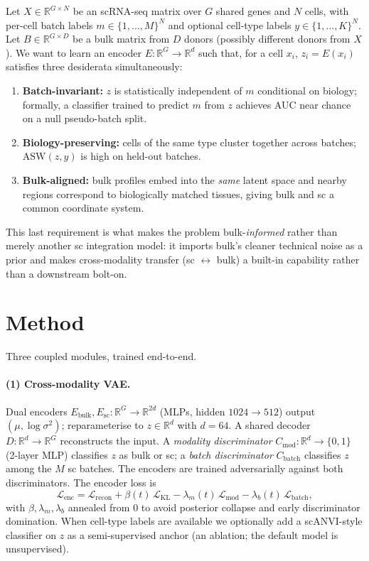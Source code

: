 \documentclass[11pt]{article}
\begin{document}
Let $X \in \mathbb{R}^{G \times N}$ be an scRNA-seq matrix over $G$ shared
genes and $N$ cells, with per-cell batch labels $m \in \{1,\dots,M\}^{N}$ and
optional cell-type labels $y \in \{1,\dots,K\}^{N}$. Let
$B \in \mathbb{R}^{G \times D}$ be a bulk matrix from $D$ donors (possibly
different donors from $X$). We want to learn an encoder
$E: \mathbb{R}^{G} \to \mathbb{R}^{d}$ such that, for a cell $x_i$,
$z_i = E(x_i)$ satisfies three desiderata simultaneously:
\begin{enumerate}
\itemsep=0pt
\item \textbf{Batch-invariant:} $z$ is statistically independent of $m$
  conditional on biology; formally, a classifier trained to predict $m$ from
  $z$ achieves AUC near chance on a null pseudo-batch split.
\item \textbf{Biology-preserving:} cells of the same type cluster together
  across batches; $\mathrm{ASW}(z, y)$ is high on held-out batches.
\item \textbf{Bulk-aligned:} bulk profiles embed into the \emph{same} latent
  space and nearby regions correspond to biologically matched tissues, giving
  bulk and sc a common coordinate system.
\end{enumerate}
This last requirement is what makes the problem bulk-\emph{informed} rather
than merely another sc integration model: it imports bulk's cleaner technical
noise as a prior and makes cross-modality transfer (sc $\leftrightarrow$ bulk)
a built-in capability rather than a downstream bolt-on.

\section{Method}

Three coupled modules, trained end-to-end.

\paragraph{(1) Cross-modality VAE.}
Dual encoders $E_{\mathrm{bulk}}, E_{\mathrm{sc}}: \mathbb{R}^{G} \to
\mathbb{R}^{2d}$ (MLPs, hidden $1024 \to 512$) output
$(\mu, \log\sigma^{2})$; reparameterise to $z \in \mathbb{R}^{d}$ with
$d{=}64$. A shared decoder $D: \mathbb{R}^{d} \to \mathbb{R}^{G}$
reconstructs the input. A \emph{modality discriminator}
$C_{\mathrm{mod}}: \mathbb{R}^{d} \to \{0,1\}$ (2-layer MLP) classifies $z$ as
bulk or sc; a \emph{batch discriminator} $C_{\mathrm{batch}}$ classifies $z$
among the $M$ sc batches. The encoders are trained adversarially against both
discriminators. The encoder loss is
\[
\mathcal{L}_{\mathrm{enc}}
  = \mathcal{L}_{\mathrm{recon}}
  + \beta(t)\, \mathcal{L}_{\mathrm{KL}}
  - \lambda_m(t)\, \mathcal{L}_{\mathrm{mod}}
  - \lambda_b(t)\, \mathcal{L}_{\mathrm{batch}},
\]
with $\beta, \lambda_m, \lambda_b$ annealed from $0$ to avoid posterior
collapse and early discriminator domination. When cell-type labels are
available we optionally add a scANVI-style classifier on $z$ as a
semi-supervised anchor (an ablation; the default model is unsupervised).
\end{document}
